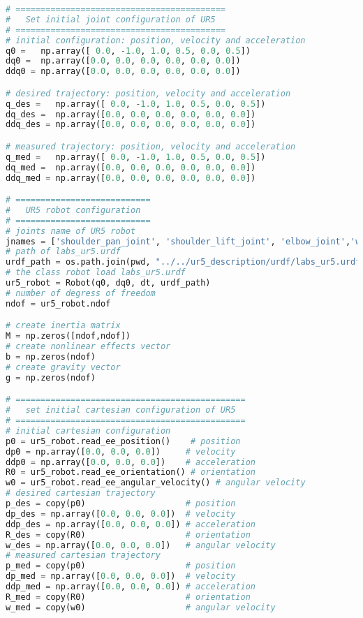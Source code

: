 \begin{lstlisting}[language=Python, caption={Move the ur5 robot end-effector using pose propotional-derivative control method \eqref{eq:pose_PD} to achieve position $\mathbf{p_0}=\begin{bmatrix}  0.577 &   0.192 &   0.364 \end{bmatrix}$~m and angle/axis orientation $\theta = \pi$ / $\mathbf{r}=\begin{bmatrix} 1 & 0 & 0 \end{bmatrix}$.}, label={lst:pose_PD}]
# ==========================================
#   Set initial joint configuration of UR5
# ==========================================
# initial configuration: position, velocity and acceleration 
q0 =   np.array([ 0.0, -1.0, 1.0, 0.5, 0.0, 0.5])
dq0 =  np.array([0.0, 0.0, 0.0, 0.0, 0.0, 0.0]) 
ddq0 = np.array([0.0, 0.0, 0.0, 0.0, 0.0, 0.0]) 

# desired trajectory: position, velocity and acceleration
q_des =   np.array([ 0.0, -1.0, 1.0, 0.5, 0.0, 0.5])
dq_des =  np.array([0.0, 0.0, 0.0, 0.0, 0.0, 0.0]) 
ddq_des = np.array([0.0, 0.0, 0.0, 0.0, 0.0, 0.0]) 

# measured trajectory: position, velocity and acceleration
q_med =   np.array([ 0.0, -1.0, 1.0, 0.5, 0.0, 0.5])
dq_med =  np.array([0.0, 0.0, 0.0, 0.0, 0.0, 0.0]) 
ddq_med = np.array([0.0, 0.0, 0.0, 0.0, 0.0, 0.0]) 

# ===========================
#   UR5 robot configuration
# ===========================
# joints name of UR5 robot
jnames = ['shoulder_pan_joint', 'shoulder_lift_joint', 'elbow_joint','wrist_1_joint', 'wrist_2_joint', 'wrist_3_joint']
# path of labs_ur5.urdf
urdf_path = os.path.join(pwd, "../../ur5_description/urdf/labs_ur5.urdf")
# the class robot load labs_ur5.urdf
ur5_robot = Robot(q0, dq0, dt, urdf_path)
# number of degress of freedom
ndof = ur5_robot.ndof

# create inertia matrix 
M = np.zeros([ndof,ndof])
# create nonlinear effects vector
b = np.zeros(ndof)
# create gravity vector
g = np.zeros(ndof)

# ==============================================
#   set initial cartesian configuration of UR5
# ==============================================
# initial cartesian configuration
p0 = ur5_robot.read_ee_position()    # position
dp0 = np.array([0.0, 0.0, 0.0])     # velocity
ddp0 = np.array([0.0, 0.0, 0.0])    # acceleration
R0 = ur5_robot.read_ee_orientation() # orientation
w0 = ur5_robot.read_ee_angular_velocity() # angular velocity
# desired cartesian trajectory
p_des = copy(p0)                    # position
dp_des = np.array([0.0, 0.0, 0.0])  # velocity
ddp_des = np.array([0.0, 0.0, 0.0]) # acceleration
R_des = copy(R0)                    # orientation
w_des = np.array([0.0, 0.0, 0.0])   # angular velocity
# measured cartesian trajectory
p_med = copy(p0)                    # position
dp_med = np.array([0.0, 0.0, 0.0])  # velocity
ddp_med = np.array([0.0, 0.0, 0.0]) # acceleration
R_med = copy(R0)                    # orientation
w_med = copy(w0)                    # angular velocity


\end{lstlisting}
